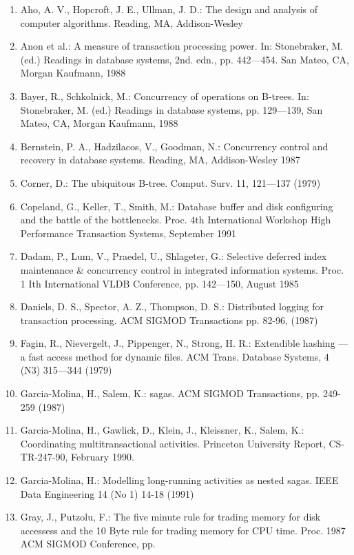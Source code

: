 \documentclass[a4paper,12pt,notitlepage,twoside,openright]{article}
\begin{document}
\begin{enumerate}
\def\labelenumi{\arabic{enumi}.}
\item
  Aho, A. V., Hopcroft, J. E., Ullman, J. D.: The design and analysis of
  computer algorithms. Reading, MA, Addison-Wesley
\item
  Anon et al.: A measure of transaction processing power. In:
  Stonebraker, M. (ed.) Readings in database systems, 2nd. edn., pp.
  442---454. San Mateo, CA, Morgan Kaufmann, 1988
\item
  Bayer, R., Schkolnick, M.: Concurrency of operations on B-trees. In:
  Stonebraker, M. (ed.) Readings in database systems, pp. 129---139, San
  Mateo, CA, Morgan Kaufmann, 1988
\item
  Bernstein, P. A., Hadzilacos, V., Goodman, N.: Concurrency control and
  recovery in database systems. Reading, MA, Addison-Wesley 1987
\item
  Corner, D.: The ubiquitous B-tree. Comput. Surv. 11, 121---137 (1979)
\item
  Copeland, G., Keller, T., Smith, M.: Database buffer and disk
  configuring and the battle of the bottlenecks. Proc. 4th International
  Workshop High Performance Transaction Systems, September 1991
\item
  Dadam, P., Lum, V., Praedel, U., Shlageter, G.: Selective deferred
  index maintenance \& concurrency control in integrated information
  systems. Proc. 1 Ith International VLDB Conference, pp. 142---150,
  August 1985
\item
  Daniels, D. S., Spector, A. Z., Thompson, D. S.: Distributed logging
  for transaction processing. ACM SIGMOD Transactions pp. 82-96, (1987)
\item
  Fagin, R., Nievergelt, J., Pippenger, N., Strong, H. R.: Extendible
  hashing --- a fast access method for dynamic files. ACM Trans.
  Database Systems, 4 (N3) 315---344 (1979)
\item
  Garcia-Molina, H., Salem, K.: sagas. ACM SIGMOD Transactions, pp.
  249-259 (1987)
\item
  Garcia-Molina, H., Gawlick, D., Klein, J., Kleissner, K., Salem, K.:
  Coordinating multitransactional activities. Princeton University
  Report, CS-TR-247-90, February 1990.
\item
  Garcia-Molina, H.: Modelling long-running activities as nested sagas.
  IEEE Data Engineering 14 (No 1) 14-18 (1991)
\item
  Gray, J., Putzolu, F.: The five minute rule for trading memory for
  disk accessess and the 10 Byte rule for trading memory for CPU time.
  Proc. 1987 ACM SIGMOD Conference, pp.
\end{enumerate}
\end{document}
